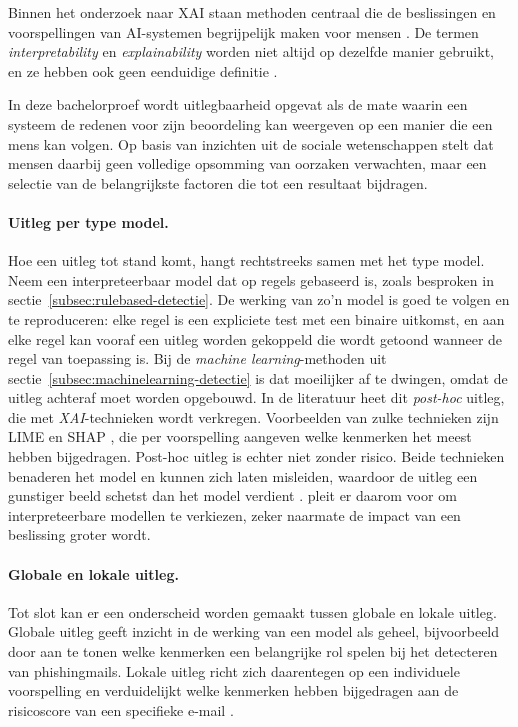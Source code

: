 Binnen het onderzoek naar XAI staan methoden centraal die de beslissingen en voorspellingen van AI-systemen begrijpelijk maken voor mensen \autocite{Miller2017}. De termen \emph{interpretability} en \emph{explainability} worden niet altijd op dezelfde manier gebruikt, en ze hebben ook geen eenduidige definitie \autocite{Lipton2016}.

In deze bachelorproef wordt uitlegbaarheid opgevat als de mate waarin een systeem de redenen voor zijn beoordeling kan weergeven op een manier die een mens kan volgen. Op basis van inzichten uit de sociale wetenschappen stelt \textcite{Miller2017} dat mensen daarbij geen volledige opsomming van oorzaken verwachten, maar een selectie van de belangrijkste factoren die tot een resultaat bijdragen.

\paragraph{Uitleg per type model.}
Hoe een uitleg tot stand komt, hangt rechtstreeks samen met het type model. Neem een interpreteerbaar model dat op regels gebaseerd is, zoals besproken in sectie~\ref{subsec:rulebased-detectie}. De werking van zo'n model is goed te volgen en te reproduceren: elke regel is een expliciete test met een binaire uitkomst, en aan elke regel kan vooraf een uitleg worden gekoppeld die wordt getoond wanneer de regel van toepassing is. Bij de \emph{machine learning}-methoden uit sectie~\ref{subsec:machinelearning-detectie} is dat moeilijker af te dwingen, omdat de uitleg achteraf moet worden opgebouwd. In de literatuur heet dit \emph{post-hoc} uitleg, die met \emph{XAI}-technieken wordt verkregen.
Voorbeelden van zulke technieken zijn LIME \autocite{Ribeiro2016} en SHAP \autocite{Lundberg2017}, die per voorspelling aangeven welke kenmerken het meest hebben bijgedragen. Post-hoc uitleg is echter niet zonder risico. Beide technieken benaderen het model en kunnen zich laten misleiden, waardoor de uitleg een gunstiger beeld schetst dan het model verdient \autocite{Slack2019}. \textcite{Rudin2019} pleit er daarom voor om interpreteerbare modellen te verkiezen, zeker naarmate de impact van een beslissing groter wordt.

\paragraph{Globale en lokale uitleg.}
Tot slot kan er een onderscheid worden gemaakt tussen globale en lokale uitleg. Globale uitleg geeft inzicht in de werking van een model als geheel, bijvoorbeeld door aan te tonen welke kenmerken een belangrijke rol spelen bij het detecteren van phishingmails. Lokale uitleg richt zich daarentegen op een individuele voorspelling en verduidelijkt welke kenmerken hebben bijgedragen aan de risicoscore van een specifieke e-mail \autocite{Guidotti2018}.

